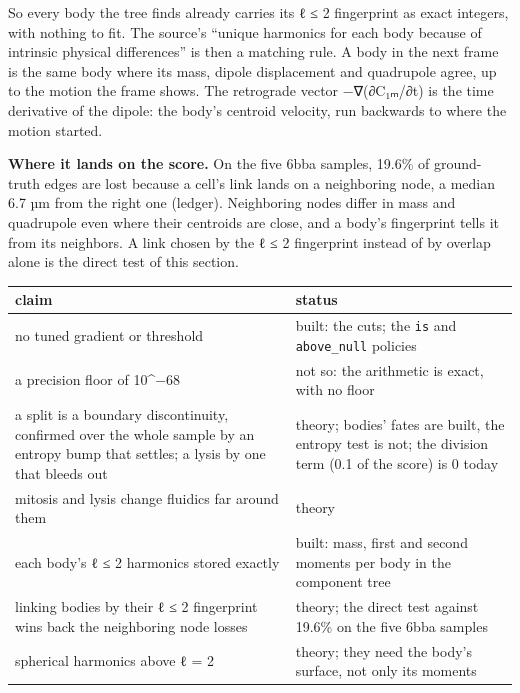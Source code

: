 So every body the tree finds already carries its ℓ ≤ 2 fingerprint as exact integers, with nothing to fit. The source's “unique harmonics for each body because of intrinsic physical differences” is then a matching rule. A body in the next frame is the same body where its mass, dipole displacement and quadrupole agree, up to the motion the frame shows. The retrograde vector −∇(∂C₁ₘ/∂t) is the time derivative of the dipole: the body's centroid velocity, run backwards to where the motion started.

\textbf{Where it lands on the score.} On the five 6bba samples, 19.6\% of ground-truth edges are lost because a cell's link lands on a neighboring node, a median 6.7 µm from the right one (ledger). Neighboring nodes differ in mass and quadrupole even where their centroids are close, and a body's fingerprint tells it from its neighbors. A link chosen by the ℓ ≤ 2 fingerprint instead of by overlap alone is the direct test of this section.

{\small
\setlength{\tabcolsep}{6pt}
\begin{longtable}{>{\RaggedRight\arraybackslash}p{}>{\RaggedRight\arraybackslash}p{}}
\toprule
claim & status \\
\midrule
\endhead
no tuned gradient or threshold & built: the cuts; the \texttt{is} and \texttt{above\_\allowbreak{}null} policies \\
a precision floor of 10\textasciicircum{}−68 & not so: the arithmetic is exact, with no floor \\
a split is a boundary discontinuity, confirmed over the whole sample by an entropy bump that settles; a lysis by one that bleeds out & theory; bodies' fates are built, the entropy test is not; the division term (0.1 of the score) is 0 today \\
mitosis and lysis change fluidics far around them & theory \\
each body's ℓ ≤ 2 harmonics stored exactly & built: mass, first and second moments per body in the component tree \\
linking bodies by their ℓ ≤ 2 fingerprint wins back the neighboring node losses & theory; the direct test against 19.6\% on the five 6bba samples \\
spherical harmonics above ℓ = 2 & theory; they need the body's surface, not only its moments \\
\bottomrule
\end{longtable}
}

